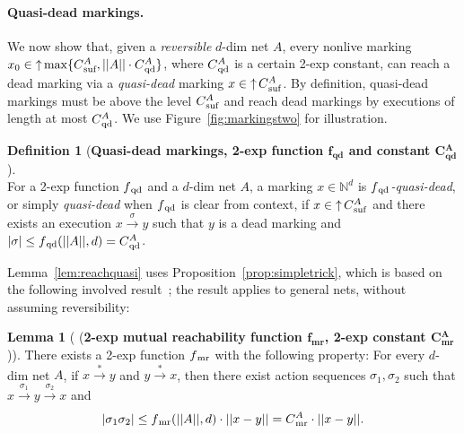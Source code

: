 \documentclass[11pt,a4paper]{amsart}
\newcommand{\step}[1]{\mathrel{\xrightarrow{#1}}}
\newcommand{\reach}{\step{*}}
\newcommand{\nnorm}[1]{||#1||}
\newcommand{\mr}{{}_\textnormal{mr}}
\newcommand{\bmr}{{}_\textbf{mr}}
\newcommand{\upC}[1]{\mathop{\uparrow}#1}
\newcommand{\suf}{{}_\textnormal{suf}}
\newcommand{\qd}{{}_\textnormal{qd}}
\newcommand{\bqd}{{}_\textbf{qd}}
\newcommand{\Nat}{\mathbb{N}}
\newcommand{\setN}{\Nat}
\theoremstyle{plain}
\theoremstyle{definition}
\newtheorem{defi}[thm]{Definition}
\theoremstyle{defC}
\theoremstyle{thmC}
\newtheorem{lemC}[thm]{Lemma}
\begin{document}
\paragraph{Quasi-dead markings.}
We now show that, given a \emph{reversible} $d$-dim net $A$,
every nonlive marking $x_0\in\upC{\max\{C\suf^A,\nnorm{A}\cdot C\qd^A\}}$,
where $C\qd^A$ is a certain 2-exp constant,  can reach a dead marking via 
a  \emph{quasi-dead} marking $x\in\upC{C\suf^A}$.
By definition, quasi-dead markings must be above the level $C\suf^A$
and reach dead markings by executions
of length at most $C\qd^A$.
We use Figure~\ref{fig:markingstwo} for illustration.

\begin{defi}[\textbf{Quasi-dead markings, 2-exp function $\bm{f\bqd}$ and
constant	$\bm{C\bqd^A}$}]
\hfill\\	
For a 2-exp function $f\qd$ and a $d$-dim net $A$, a marking $x\in\setN^d$
	is \emph{$f\qd$-quasi-dead}, or simply \emph{quasi-dead} when $f\qd$
	is clear from context, if $x\in\upC{C\suf^A}$ 
and there exists an execution $x\step{\sigma}y$ such that $y$ is a dead
marking and $|\sigma|\leq
f\qd(\nnorm{A},d)=C\qd^A$.
\end{defi}

Lemma~\ref{lem:reachquasi} uses
Proposition~\ref{prop:simpletrick},
which is based on the following involved result~\cite[Theorem
2]{DBLP:conf/fsttcs/Leroux19}; 
 the result applies to general nets,
without assuming reversibility:
\begin{lemC}[\cite{DBLP:conf/fsttcs/Leroux19} {(\textbf{2-exp mutual
	reachability function $\bm{f\bmr}$, 2-exp constant
	$\bm{C\bmr^A}$})}]\label{lem:fmr}
	There exists a 2-exp function $f\mr$
	with the following property:
	For every $d$-dim net $A$, if $x\reach y$ and $y\reach x$, then
there exist action
	sequences $\sigma_1,\sigma_2$ such that 
	$x\step{\sigma_1}y\step{\sigma_2}x$ and
	\begin{equation*}
		|\sigma_1\sigma_2|\leq
		f\mr(\nnorm{A},d)\cdot\nnorm{x-y}=
		C\mr^A\cdot\nnorm{x-y}.
	\end{equation*}		
\end{lemC}
\end{document}
